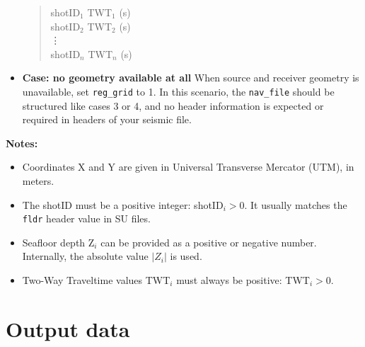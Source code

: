 \documentclass[11pt, oneside]{article}   	%
\begin{document}
\begin{itemize}
    \begin{quote}
    shotID$_1$ \quad TWT$_1$ (s) \\
    shotID$_2$ \quad TWT$_2$ (s) \\
    \quad \vdots \\
    shotID$_n$ \quad TWT$_n$ (s)
    \end{quote}
    
    \item \textbf{Case: no geometry available at all} When source and receiver geometry is unavailable, set  \texttt{reg\_grid} to 1. In this scenario, the  \texttt{nav\_file} should be structured like cases 3 or 4, and no header information is expected or required in headers  of your seismic file.

    
\end{itemize}


\vspace{0.5em}
\noindent
\textbf{Notes:}
\begin{itemize}
    \item Coordinates X and Y are given in Universal Transverse Mercator (UTM), in meters.
    \item The shotID must be a positive integer: shotID$_i > 0$. It usually matches the \texttt{fldr} header value in SU files.
    \item Seafloor depth Z$_i$ can be provided as a positive or negative number. Internally, the absolute value $|Z_i|$ is used.
    \item Two-Way Traveltime values TWT$_i$ must always be positive: TWT$_i > 0$.
\end{itemize}

\section{Output data}\label{sec5}
\end{document}
